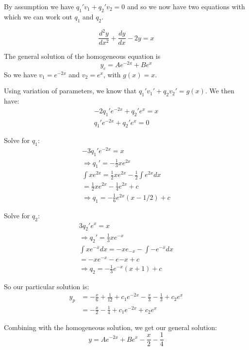 \documentclass[a4paper,10pt]{article}
\begin{document}
By assumption we have $q_1'v_1 + q_2'v_2 = 0$ and so we now have two
equations with which we can work out $q_1$ and $q_2$.

\begin{ex}
	\[
		\frac{d^2y}{dx^2} + \frac{dy}{dx} - 2y = x
	\]

	The general solution of the homogeneous equation is
	\[
		y_c = Ae^{-2x} + Be^x
	\]
	So we have $v_1 = e^{-2x}$ and $v_2 = e^x$, with $g(x) = x$.

	Using variation of parameters, we know that
	$q_1'v_1' + q_2v_2' = g(x)$. We then have:
	\begin{align*}
		-2 q_1' e^{-2x} + q_2' e^x = x \\
		q_1' e^{-2x} + q_2' e^x = 0
	\end{align*}

	Solve for $q_1$:
	\begin{gather*}
		-3q_1'e^{-2x} = x \\
		\Rightarrow q_1' = -\frac{1}{3} xe^{2x} \\
		\int xe^{2x} = \frac{1}{2}xe^{2x} - \frac{1}{2} \int e^{2x} dx \\
		= \frac{1}{2}xe^{2x} - \frac{1}{4}e^{2x} + c \\
		\Rightarrow q_1 = -\frac{1}{6}e^{2x} (x - 1/2) + c
	\end{gather*}

	Solve for $q_2$:
	\begin{gather*}
		3q_2'e^x = x \\
		\Rightarrow q_2' = \frac{1}{3}xe^{-x} \\
		\int xe^{-x} dx = -xe_{-x} - \int -e^{-x} dx \\
		= -xe^{-x} - e{-x} +c \\
		\Rightarrow q_2 = -\frac{1}{3}e^{-x}(x+1) + c
	\end{gather*}

	So our particular solution is:
	\begin{align*}
		y_p &= -\frac{x}{6} + \frac{1}{12} + c_1e^{-2x}
		- \frac{x}{3} - \frac{1}{3} + c_2e^x \\
		&= -\frac{x}{2} - \frac{1}{4} + c_1e^{-2x} + c_2e^x
	\end{align*}

	Combining with the homogeneous solution, we get our general solution:
	\[
		y = Ae^{-2x} + Be^{x} - \frac{x}{2} - \frac{1}{4}
	\]
\end{ex}
\end{document}
